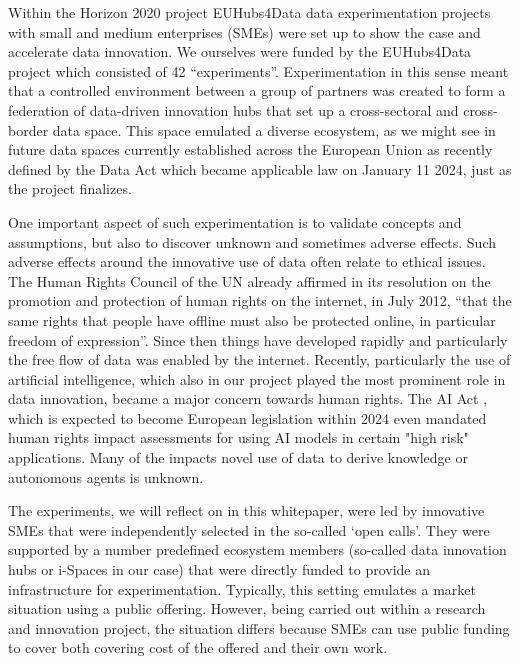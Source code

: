 Within the Horizon 2020 project EUHubs4Data \cite{EUH4D} data experimentation projects
with small and medium enterprises (SMEs) were
set up to show the case and accelerate data innovation. We ourselves
were funded by the EUHubs4Data project which consisted of 42
``experiments''. Experimentation in this sense
meant that a controlled environment between a group of partners was created to form a federation of data-driven innovation hubs
that set up a cross-sectoral and cross-border data space. 
This space emulated a diverse ecosystem, as we might see in future data spaces currently established across the European Union as recently defined by the Data Act \cite{} which became applicable law on January 11 2024, just as the project finalizes.

One important aspect of such experimentation is to validate concepts and assumptions, but also to discover unknown and sometimes adverse effects.
Such adverse effects around the innovative use of data often relate to ethical issues. The Human Rights Council of the UN already affirmed in its resolution on the promotion and protection of human rights on the internet, in July 2012, “that the same rights that people have offline must also be protected online, in particular freedom of expression”. Since then things have developed rapidly and particularly the free flow of data was enabled by the internet. Recently, particularly the use of artificial intelligence, which also in our project played the most prominent role in data innovation, became a major concern towards human rights. The AI Act \cite{AIAct}, which is expected to become European legislation within 2024 even mandated human rights impact assessments for using AI models in certain "high risk" applications. Many of the impacts novel use of data to derive knowledge or autonomous agents is unknown.

The experiments, we will reflect on in this whitepaper, were led by innovative SMEs that were
independently selected in the so-called `open calls'. They were supported by a number predefined ecosystem members (so-called data innovation hubs or i-Spaces
in our case) that were directly funded to provide an infrastructure for
experimentation. Typically, this setting emulates a market situation
using a public offering. However, being carried out within a research
and innovation project, the situation differs because SMEs can use
public funding to cover both covering cost of the offered and their own
work.

